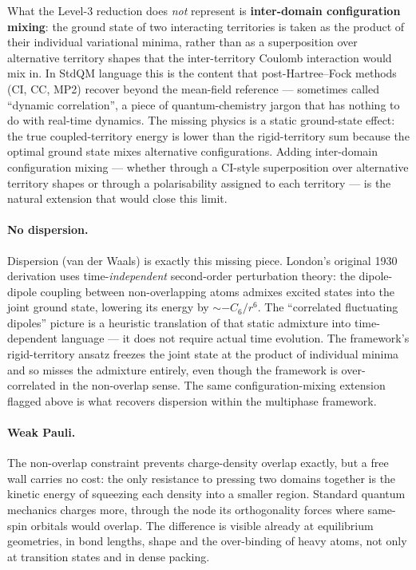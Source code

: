 What the Level-3 reduction does \emph{not} represent is \textbf{inter-domain configuration mixing}: the ground state of two interacting territories is taken as the product of their individual variational minima, rather than as a superposition over alternative territory shapes that the inter-territory Coulomb interaction would mix in. In StdQM language this is the content that post-Hartree--Fock methods (CI, CC, MP2) recover beyond the mean-field reference --- sometimes called ``dynamic correlation'', a piece of quantum-chemistry jargon that has nothing to do with real-time dynamics. The missing physics is a static ground-state effect: the true coupled-territory energy is lower than the rigid-territory sum because the optimal ground state mixes alternative configurations. Adding inter-domain configuration mixing --- whether through a CI-style superposition over alternative territory shapes or through a polarisability assigned to each territory --- is the natural extension that would close this limit.

\paragraph{No dispersion.}
Dispersion (van der Waals) is exactly this missing piece. London's original 1930 derivation uses time-\emph{independent} second-order perturbation theory: the dipole-dipole coupling between non-overlapping atoms admixes excited states into the joint ground state, lowering its energy by $\sim -C_6/r^6$. The ``correlated fluctuating dipoles'' picture is a heuristic translation of that static admixture into time-dependent language --- it does not require actual time evolution. The framework's rigid-territory ansatz freezes the joint state at the product of individual minima and so misses the admixture entirely, even though the framework is over-correlated in the non-overlap sense. The same configuration-mixing extension flagged above is what recovers dispersion within the multiphase framework.

\paragraph{Weak Pauli.}
The non-overlap constraint prevents charge-density overlap exactly, but a free wall carries no cost: the only resistance to pressing two domains together is the kinetic energy of squeezing each density into a smaller region. Standard quantum mechanics charges more, through the node its orthogonality forces where same-spin orbitals would overlap. The difference is visible already at equilibrium geometries, in bond lengths, shape and the over-binding of heavy atoms, not only at transition states and in dense packing.


